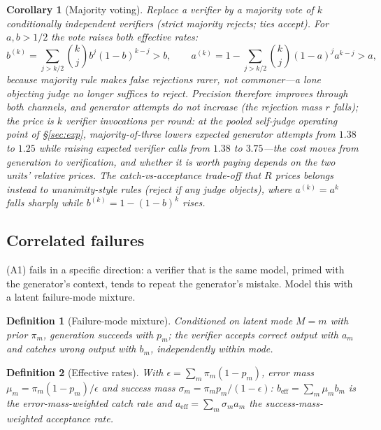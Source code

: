 \documentclass[11pt]{article}
\newtheorem{corollary}{Corollary}
\newtheorem{definition}{Definition}
\begin{document}
\begin{corollary}[Majority voting]\label{cor:majority}
Replace a verifier by a majority vote of $k$ conditionally
independent verifiers (strict majority rejects; ties accept).  For
$a, b > 1/2$ the vote raises \emph{both} effective rates:
\[
b^{(k)} = \sum_{j>k/2}\binom{k}{j}b^j(1-b)^{k-j} > b, \qquad
a^{(k)} = 1 - \sum_{j>k/2}\binom{k}{j}(1-a)^j a^{k-j} > a,
\]
because majority rule makes false rejections \emph{rarer}, not
commoner---a lone objecting judge no longer suffices to reject.
Precision therefore improves through both channels, and generator
attempts do not increase (the rejection mass $r$ falls); the price
is $k$ verifier invocations per round: at the pooled self-judge
operating point of §\ref{sec:exp}, majority-of-three lowers
expected generator attempts from $1.38$ to $1.25$ while raising
expected verifier calls from $1.38$ to $3.75$---the cost moves from
generation to verification, and whether it is worth paying depends
on the two units' relative prices.  The catch-vs-acceptance
trade-off that $R$ prices belongs instead to unanimity-style rules
(reject if any judge objects), where $a^{(k)} = a^k$ falls sharply
while $b^{(k)} = 1-(1-b)^k$ rises.
\end{corollary}

\subsection{Correlated failures}\label{sec:mixture}

(A1) fails in a specific direction: a verifier that is the same
model, primed with the generator's context, tends to repeat the
generator's mistake.  Model this with a latent failure-mode mixture.

\begin{definition}[Failure-mode mixture]\label{def:mixture}
Conditioned on latent mode $M=m$ with prior $\pi_m$, generation
succeeds with $p_m$; the verifier accepts correct output with
$a_m$ and catches wrong output with $b_m$, independently within
mode.
\end{definition}

\begin{definition}[Effective rates]\label{def:beff}
With $\epsilon = \sum_m \pi_m(1-p_m)$, error mass
$\mu_m = \pi_m(1-p_m)/\epsilon$ and success mass
$\sigma_m = \pi_m p_m/(1-\epsilon)$:
$b_{\mathrm{eff}} = \sum_m \mu_m b_m$ is the error-mass-weighted
catch rate and $a_{\mathrm{eff}} = \sum_m \sigma_m a_m$ the
success-mass-weighted acceptance rate.
\end{definition}
\end{document}
